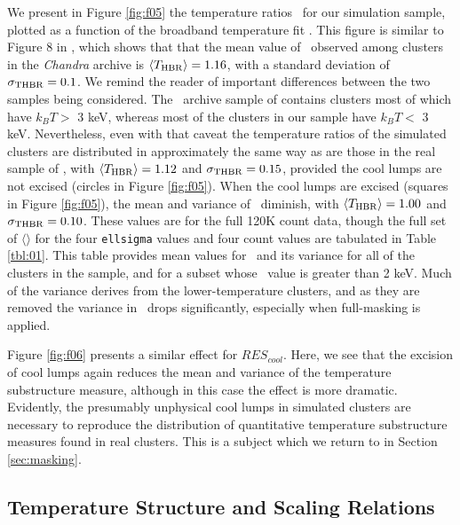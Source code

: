 \documentclass[12pt,preprint]{aastex}
\begin{document}
We present in Figure \ref{fig:f05} the temperature ratios \thbr\ for
our simulation sample, plotted as a function of the broadband
temperature fit \tbroad.  This figure is similar to Figure 8 in
\cite{cavagnolo_bandpass_2008}, which shows that that the mean value
of \thbr\ observed among clusters in the {\em Chandra} archive is
$\langle T_{\rm HBR} \rangle = 1.16$, with a standard deviation of
$\sigma_{\rm THBR} = 0.1$.  We remind the reader of important
differences between the two samples being considered.  The \chandra\
archive sample of \cite{cavagnolo_bandpass_2008} contains clusters
most of which have $k_BT >$ 3 keV, whereas most of the clusters in our
sample have $k_BT <$ 3 keV.  Nevertheless, even with that caveat the
temperature ratios of the simulated clusters are distributed in
approximately the same way as are those in the real sample of
\cite{cavagnolo_bandpass_2008}, with $\langle T_{\rm HBR} \rangle =
1.12$ and $\sigma_{\rm THBR} = 0.15$, provided the cool lumps are not
excised (circles in Figure \ref{fig:f05}).  When the cool lumps are
excised (squares in Figure \ref{fig:f05}), the mean and variance of
\thbr\ diminish, with $\langle T_{\rm HBR} \rangle = 1.00$ and
$\sigma_{\rm THBR} = 0.10$.  These values are for the full 120K count
data, though the full set of $\langle$\thbr$\rangle$ for the four
\verb|ellsigma| values and four count values are tabulated in Table
\ref{tbl:01}.  This table provides mean values for \thbr\ and its
variance for all of the clusters in the sample, and for a subset whose
\thard\ value is greater than 2 keV.  Much of the variance derives
from the lower-temperature clusters, and as they are removed the
variance in \thbr\ drops significantly, especially when full-masking
is applied.

Figure \ref{fig:f06} presents a similar effect for $RES_{cool}$.
Here, we see that the excision of cool lumps again reduces the mean
and variance of the temperature substructure measure, although in this
case the effect is more dramatic.  Evidently, the presumably
unphysical cool lumps in simulated clusters are necessary to reproduce
the distribution of quantitative temperature substructure measures
found in real clusters.  This is a subject which we return to in
Section \ref{sec:masking}.


\subsection{Temperature Structure and Scaling Relations}
\label{sec:mtx}
\end{document}
